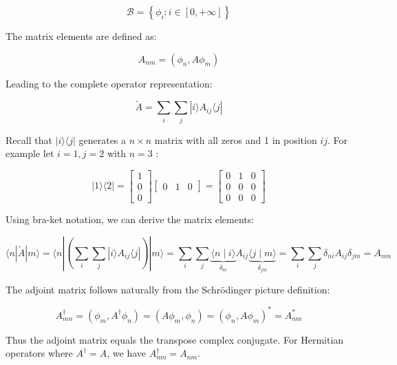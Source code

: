 \begin{equation}
\mathcal{B}=\left\{\phi_{i}: i \in[0,+\infty]\right\}
\end{equation}

The matrix elements are defined as:

\begin{equation}
A_{n m}=\left(\phi_{n}, A \phi_{m}\right)
\end{equation}

Leading to the complete operator representation:

\begin{equation}
\tilde{A}=\sum_{i} \sum_{j}|i\rangle A_{i j}\langle j|
\end{equation}


Recall that $|i\rangle\langle j|$ generates a $n \times n$ matrix with all zeros and 1 in position $i j$. For example let $i=1, j=2$ with $n=3$ :

\[
|1\rangle\langle 2|=\left[\begin{array}{l}
1  \\
0 \\
0
\end{array}\right]\left[\begin{array}{lll}
0 & 1 & 0
\end{array}\right]=\left[\begin{array}{lll}
0 & 1 & 0 \\
0 & 0 & 0 \\
0 & 0 & 0
\end{array}\right]
\]

Using bra-ket notation, we can derive the matrix elements:

\begin{equation}
\langle n| \tilde{A}|m\rangle=\langle n|\left(\sum_{i} \sum_{j}|i\rangle A_{i j}\langle j|\right)|m\rangle=\sum_{i} \sum_{j} \underbrace{\langle n \mid i\rangle}_{\delta_{n i}} A_{i j} \underbrace{\langle j \mid m\rangle}_{\delta_{j m}}=\sum_{i} \sum_{j} \delta_{n i} A_{i j} \delta_{j m}=A_{n m}
\end{equation}

The adjoint matrix follows naturally from the Schrödinger picture definition:

\begin{equation}
A_{m n}^{\dagger}=\left(\phi_{m}, A^{\dagger} \phi_{n}\right)=\left(A \phi_{m}, \phi_{n}\right)=\left(\phi_{n}, A \phi_{m}\right)^{*}=A_{n m}^{*}
\end{equation}

Thus the adjoint matrix equals the transpose complex conjugate. For Hermitian operators where $A^{\dagger}=A$, we have $A_{n m}^{\dagger}=A_{n m}$.

